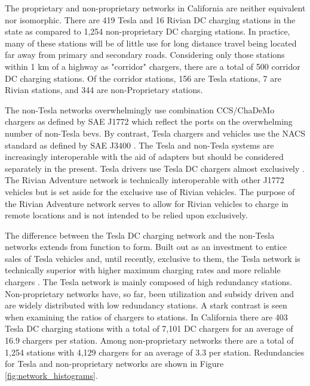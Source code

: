 \documentclass[11pt]{article}
\begin{document}
\begin{multicols}{2}

The proprietary and non-proprietary networks in California are neither equivalent nor isomorphic. There are 419 Tesla and 16 Rivian DC charging stations in the state as compared to 1,254 non-proprietary DC charging stations. In practice, many of these stations will be of little use for long distance travel being located far away from primary and secondary roads. Considering only those stations within 1 km of a highway as "corridor" chargers, there are a total of 500 corridor DC charging stations. Of the corridor stations, 156 are Tesla stations, 7 are Rivian stations, and 344 are non-Proprietary stations.

The non-Tesla networks overwhelmingly use combination CCS/ChaDeMo chargers as defined by SAE J1772 \cite{SAE_J1772} which reflect the ports on the overwhelming number of non-Tesla \glspl{bev}. By contrast, Tesla chargers and vehicles use the NACS standard as defined by SAE J3400 \cite{SAE_J3400}. The Tesla and non-Tesla systems are increasingly interoperable with the aid of adapters but should be considered separately in the present. Tesla drivers use Tesla DC chargers almost exclusively \cite{Visaria_2022}. The Rivian Adventure network is technically interoperable with other J1772 vehicles but is set aside for the exclusive use of Rivian vehicles. The purpose of the Rivian Adventure network serves to allow for Rivian vehicles to charge in remote locations and is not intended to be relied upon exclusively.

The difference between the Tesla DC charging network and the non-Tesla networks extends from function to form. Built out as an investment to entice sales of Tesla vehicles and, until recently, exclusive to them, the Tesla network is technically superior with higher maximum charging rates and more reliable chargers \cite{Rempel_2023, Kozumplik_2022}. The Tesla network is mainly composed of high redundancy stations. Non-proprietary networks have, so far, been utilization and subsidy driven \cite{Gamage_2023} and are widely distributed with low redundancy stations. A stark contrast is seen when examining the ratios of chargers to stations. In California there are 403 Tesla DC charging stations with a total of 7,101 DC chargers for an average of 16.9 chargers per station. Among non-proprietary networks there are a total of 1,254 stations with 4,129 chargers for an average of 3.3 per station. Redundancies for Tesla and non-proprietary networks are shown in Figure \ref{fig:network_histograms}. 



\end{multicols}
\end{document}
